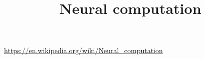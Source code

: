 \documentclass[a4paper]{standalone}
\title{Neural computation}
\begin{document}
    \maketitle
    \url{https://en.wikipedia.org/wiki/Neural_computation}
\end{document}
